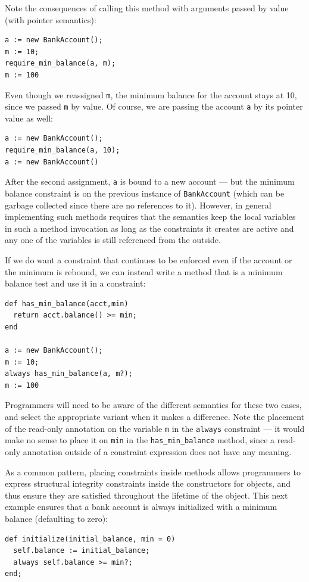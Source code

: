 Note the consequences of calling this method with arguments passed by
value (with pointer semantics):
\begin{lstlisting}
a := new BankAccount();
m := 10;
require_min_balance(a, m);
m := 100
\end{lstlisting}
Even though we reassigned \verb|m|, the minimum balance for the
account stays at 10, since we passed \verb|m| by value.  Of course, we
are passing the account \verb|a| by its pointer value as well:
\begin{lstlisting}
a := new BankAccount();
require_min_balance(a, 10);
a := new BankAccount()
\end{lstlisting}
After the second assignment, \verb|a| is bound to a new account ---
but the minimum balance constraint is on the previous instance of
\verb|BankAccount| (which can be garbage collected since there are no
references to it). However, in general implementing such methods
requires that the semantics keep the local variables in such a method
invocation as long as the constraints it creates are active and any
one of the variables is still referenced from the outside.

If we do want a constraint that continues to be enforced even if the
account or the minimum is rebound, we can instead write a method that
is a minimum balance test and use it in a constraint:
\begin{lstlisting}
def has_min_balance(acct,min)
  return acct.balance() >= min;
end

a := new BankAccount();
m := 10;
always has_min_balance(a, m?);
m := 100
\end{lstlisting}
Programmers will need to be aware of the different semantics for these
two cases, and select the appropriate variant when it makes a
difference. Note the placement of the read-only annotation on the
variable \verb|m| in the \verb|always| constraint --- it would make no
sense to place it on \verb|min| in the \verb|has_min_balance| method,
since a read-only annotation outside of a constraint expression does
not have any meaning.

As a common pattern, placing constraints inside methods allows
programmers to express structural integrity constraints inside the
constructors for objects, and thus ensure they are satisfied
throughout the lifetime of the object. This next example ensures that
a bank account is always initialized with a minimum balance
(defaulting to zero):
\begin{lstlisting}
def initialize(initial_balance, min = 0)
  self.balance := initial_balance;
  always self.balance >= min?;
end;
\end{lstlisting}

